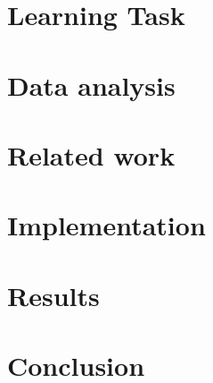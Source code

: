 \documentclass[12pt, 			%
               twoside,         %
			  ]{report}
\begin{document}





\tableofcontents






\chapter[Learning Task]{Learning Task}


\chapter[Data analysis]{Data analysis}




\chapter[Related work]{Related work}


\chapter[Implementation]{Implementation}


\chapter[Results]{Results}



\chapter[Conclusion]{Conclusion}

\printbibliography



\end{document}
